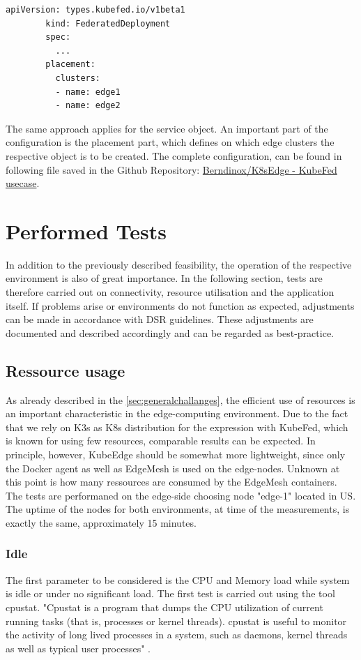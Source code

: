 \documentclass[MSC,Master,english]{twbook}%
\begin{document}
\begin{enumerate}
    \begin{lstlisting}[float,caption={Federated Object},captionpos=b]
        apiVersion: types.kubefed.io/v1beta1
        kind: FederatedDeployment
        spec:
          ...
        placement:
          clusters:
          - name: edge1
          - name: edge2
    \end{lstlisting}
    The same approach applies for the service object. An important part of the configuration is the placement part, which defines on which edge clusters the respective object is to be created. The complete configuration, can be found in following file saved in the Github Repository: \hyperref{https://github.com/Berndinox/K8sEdge/blob/main/DOCs/kubefed-usecase1.md}{}{}{Berndinox/K8sEdge - KubeFed usecase}\cite{bk-gh-usecase}.
\end{enumerate}

\section{Performed Tests}
\label{sec:dsrtest}
In addition to the previously described feasibility, the operation of the respective environment is also of great importance. In the following section, tests are therefore carried out on connectivity, resource utilisation and the application itself. If problems arise or environments do not function as expected, adjustments can be made in accordance with DSR guidelines. These adjustments are documented and described accordingly and can be regarded as best-practice.
\subsection{Ressource usage}
\label{sec:dsrtestress}
As already described in the \autoref{sec:generalchallanges}, the efficient use of resources is an important characteristic in the edge-computing environment. Due to the fact that we rely on K3s as \ac{K8s} distribution for the expression with KubeFed, which is known for using few resources, comparable results can be expected. In principle, however, KubeEdge should be somewhat more lightweight, since only the Docker agent as well as EdgeMesh is used on the edge-nodes. Unknown at this point is how many ressources are consumed by the EdgeMesh containers. The tests are performaned on the edge-side choosing node "edge-1" located in US. The uptime of the nodes for both environments, at time of the measurements, is exactly the same, approximately 15 minutes.

\subsubsection{Idle}
The first parameter to be considered is the CPU and Memory load while system is idle or under no significant load. The first test is carried out using the tool cpustat. "Cpustat  is  a  program  that dumps the CPU utilization of current running tasks (that is, processes or kernel threads).  cpustat is useful to monitor the  activity  of  long  lived processes in a system, such as daemons, kernel threads as well as typical user processes" \cite{cpustat}. \medbreak
\end{document}
